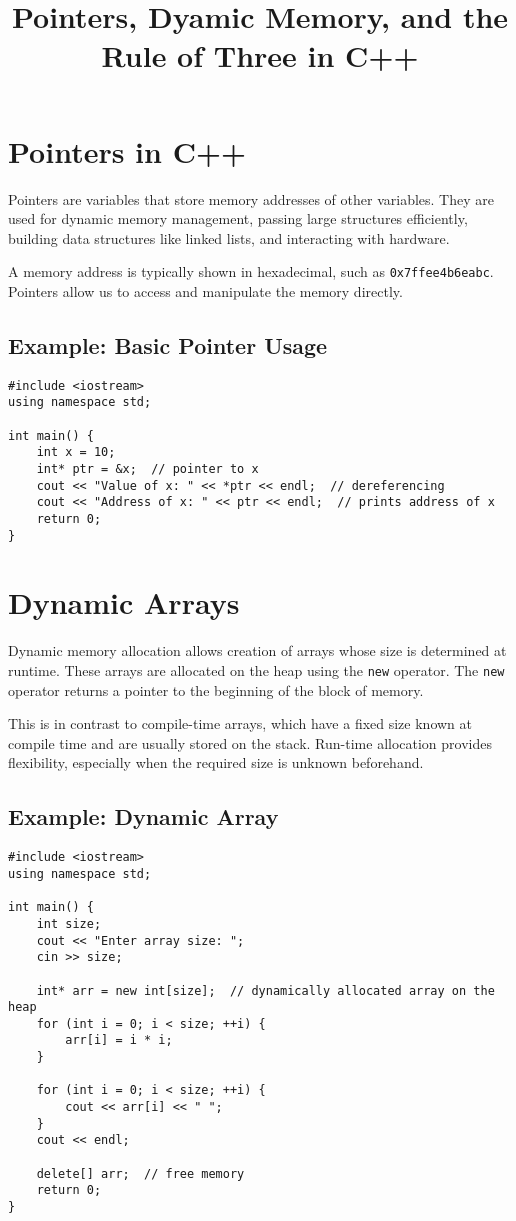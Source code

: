 \documentclass{article}
\title{Pointers, Dyamic Memory, and the Rule of Three in C++}
\author{}
\date{}
\begin{document}
\maketitle

\section{Pointers in C++}
Pointers are variables that store memory addresses of other variables. They are used for dynamic memory management, passing large structures efficiently, building data structures like linked lists, and interacting with hardware.

A memory address is typically shown in hexadecimal, such as \texttt{0x7ffee4b6eabc}. Pointers allow us to access and manipulate the memory directly.

\subsection*{Example: Basic Pointer Usage}
\begin{lstlisting}[style=cppstyle]
#include <iostream>
using namespace std;

int main() {
    int x = 10;
    int* ptr = &x;  // pointer to x
    cout << "Value of x: " << *ptr << endl;  // dereferencing
    cout << "Address of x: " << ptr << endl;  // prints address of x
    return 0;
}
\end{lstlisting}

\section{Dynamic Arrays}
Dynamic memory allocation allows creation of arrays whose size is determined at runtime. These arrays are allocated on the heap using the \texttt{new} operator. The \texttt{new} operator returns a pointer to the beginning of the block of memory.

This is in contrast to compile-time arrays, which have a fixed size known at compile time and are usually stored on the stack. Run-time allocation provides flexibility, especially when the required size is unknown beforehand.

\subsection*{Example: Dynamic Array}
\begin{lstlisting}[style=cppstyle]
#include <iostream>
using namespace std;

int main() {
    int size;
    cout << "Enter array size: ";
    cin >> size;

    int* arr = new int[size];  // dynamically allocated array on the heap
    for (int i = 0; i < size; ++i) {
        arr[i] = i * i;
    }

    for (int i = 0; i < size; ++i) {
        cout << arr[i] << " ";
    }
    cout << endl;

    delete[] arr;  // free memory
    return 0;
}
\end{lstlisting}
\end{document}
